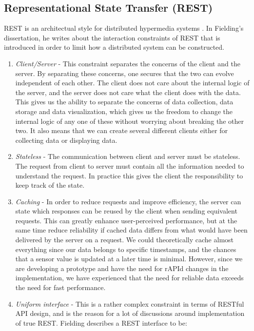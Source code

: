 \subsection{Representational State Transfer (REST)}
REST is an architectual style for distributed hypermedia systems \citep{fielding2000architectural}. In Fielding's dissertation, he writes about the interaction constraints of REST that is introduced in order to limit how a distributed system can be constructed. 

\begin{enumerate}
\item{} \emph{Client/Server} - This constraint separates the concerns of the client and the server. By separating these concerns, one secures that the two can evolve independent of each other. The client does not care about the internal logic of the server, and the server does not care what the client does with the data. This gives us the ability to separate the concerns of data collection, data storage and data visualization, which gives us the freedom to change the internal logic of any one of these without worrying about breaking the other two. It also means that we can create several different clients either for collecting data or displaying data.

\item{} \emph{Stateless} - The communication between client and server must be stateless. The request from client to server must contain all the information needed to understand the request. In practice this gives the client the responsibility to keep track of the state.

\item{} \emph{Caching} - In order to reduce requests and improve efficiency, the server can state which responses can be reused by the client when sending equivalent requests. This can greatly enhance user-perceived performance, but at the same time reduce reliability if cached data differs from what would have been delivered by the server on a request. We could theoretically cache almost everything since our data belongs to specific timestamps, and the chances that a sensor value is updated at a later time is minimal. However, since we are developing a prototype and have the need for rAPId changes in the implementation, we have experienced that the need for reliable data exceeds the need for fast performance.

\item{} \emph{Uniform interface} - This is a rather complex constraint in terms of RESTful API design, and is the reason for a lot of discussions around implementation of true REST. Fielding describes a REST interface to be:


\end{enumerate}
